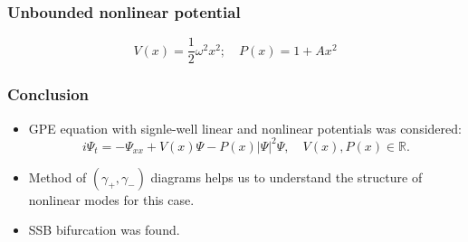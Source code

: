 \documentclass{beamer}
\begin{document}
\begin{frame}
\frametitle{Unbounded nonlinear potential}

$$V(x) = \dfrac{1}{2} \omega^2 x^2; \quad P(x) = 1 + A x^2$$

\begin{figure}
\label{pic:bifurcation_unbounded}
\end{figure}

\end{frame}


\begin{frame}
\frametitle{Conclusion}
\begin{itemize}
\item GPE equation with {\color{red} signle-well} linear and nonlinear potentials was considered:
$$i\Psi_t = -\Psi_{xx} + V(x) \Psi - P(x) |\Psi|^2 \Psi, \quad V(x), P(x) \in \mathbb{R}.$$
\item Method of $(\gamma_+, \gamma_-)$ diagrams helps us to understand the structure of nonlinear modes for this case.
\item SSB bifurcation was found. 
\end{itemize}
\end{frame}
\end{document}
